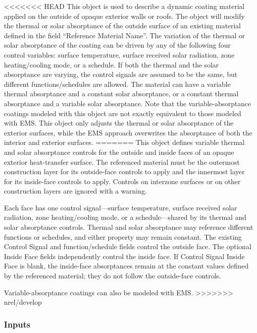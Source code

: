 <<<<<<< HEAD
This object is used to describe a dynamic coating material applied on the
outside of opaque exterior walls or roofs. The object will modify the thermal
or solar absorptance of the outside surface of an existing material defined in
the field ``Reference Material Name''. The variation of the thermal or solar
absorptance of the coating can be driven by any of the following four control
variables: surface temperature, surface received solar radiation, zone
heating/cooling mode, or a schedule. If both the thermal and the solar
absorptance are varying, the control signals are assumed to be the same, but
different functions/schedules are allowed. The material can have a variable
thermal absorptance and a constant solar absorptance, or a constant thermal
absorptance and a variable solar absorptance. Note that the variable-absorptance
coatings modeled with this object are not exactly equivalent to those modeled
with EMS. This object only adjusts the thermal or solar absorptance of the
exterior surfaces, while the EMS approach overwrites the absorptance of both the
interior and exterior surfaces.
=======
This object defines variable thermal and solar absorptance controls for the outside and inside faces of an opaque exterior heat-transfer surface. The referenced material must be the outermost construction layer for its outside-face controls to apply and the innermost layer for its inside-face controls to apply. Controls on interzone surfaces or on other construction layers are ignored with a warning.

Each face has one control signal---surface temperature, surface received solar radiation, zone heating/cooling mode, or a schedule---shared by its thermal and solar absorptance controls. Thermal and solar absorptance may reference different functions or schedules, and either property may remain constant. The existing Control Signal and function/schedule fields control the outside face. The optional Inside Face fields independently control the inside face. If Control Signal Inside Face is blank, the inside-face absorptances remain at the constant values defined by the referenced material; they do not follow the outside-face controls.

Variable-absorptance coatings can also be modeled with EMS.
>>>>>>> nrel/develop

\subsubsection{Inputs}\label{inputs-materialpropertyvariableabsorptance}

